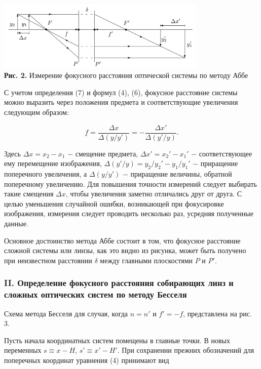 \documentclass[a4paper,12pt]{article} %
\begin{document}
\begin{center}
\includegraphics[width=0.75\textwidth]{4.1.1_2.png}\\
\textbf{Рис. 2.} Измерение фокусного расстояния оптической системы по методу Аббе \\
\end{center}

\hfill \break С учетом определения (7) и формул (4), (6), фокусное расстояние системы можно выразить через положения предмета и соответствующие увеличения следующим образом:

\begin{equation}
    f = \frac{\Delta x}{\Delta (y/y')} = - \frac{\Delta x'}{\Delta (y'/y)}.
\end{equation}

\hfill \break Здесь $\Delta x = x_2 - x_1$ $-$ смещение предмета, $\Delta x' = x_2' - x_1'$ $-$ соответствующее ему перемещение изображения, $\Delta (y'/y) = y_2/y_2' - y_1/y_1'$ $-$ приращение поперечного увеличения, а $\Delta (y/y')$ $-$ приращение величины, обратной поперечному увеличению. Для повышения точности измерений следует выбирать такие смещения $\Delta x$, чтобы увеличения заметно отличались друг от друга. С целью уменьшения случайной ошибки, возникающей при фокусировке изображения, измерения следует проводить несколько раз, усредняя полученные данные.

\hfill \break Основное достоинство метода Аббе состоит в том, что фокусное расстояние сложной системы или линзы, как это видно из рисунка, может быть получено при неизвестном расстоянии $\delta$ между главными плоскостями $P$ и $P'$.

\subsubsection*{II. Определение фокусного расстояния собирающих линз и сложных оптических систем по методу Бесселя}

\hfill \break Схема метода Бесселя для случая, когда $n = n'$ и $f' = -f$, представлена на рис. 3. 

\hfill \break Пусть начала координатных систем помещены в главные точки. В новых переменных $s \equiv x - H$, $s' \equiv x' - H'$. При сохранении прежних обозначений для поперечных координат уравнения (4) принимают вид
\end{document}
